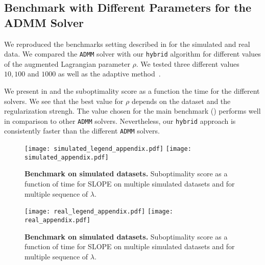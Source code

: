 \subsection{Benchmark with Different Parameters for the ADMM Solver}
\label{sec:admm-benchmarks}

We reproduced the benchmarks setting described in  for the simulated and real data.
We compared the \texttt{ADMM} solver with our \texttt{hybrid} algorithm for different values of the augmented Lagrangian parameter $\rho$.
We tested three different values $10, 100$ and $1000$ as well as the adaptive method~\parencite[Sec. 3.4.1]{boyd2010}.

We present in  and  the suboptimality score as a function the time for the different solvers.
We see that the best value for $\rho$ depends on the dataset and the regularization strengh.
The value chosen for the main benchmark () performs well in comparison to other \texttt{ADMM} solvers.
Nevertheless, our \texttt{hybrid} approach is consistently faster than the different  \texttt{ADMM} solvers.

\begin{figure*}[!t]
  \centering
  \texttt{[image: simulated\_legend\_appendix.pdf]}
  \texttt{[image: simulated\_appendix.pdf]}
  \caption{\textbf{Benchmark on simulated datasets.} Suboptimality score as a function of time for SLOPE on multiple simulated datasets and for multiple sequence of $\lambda$.}
  \label{fig:simulated_appendix}
\end{figure*}


\begin{figure*}[!t]
  \centering
  \texttt{[image: real\_legend\_appendix.pdf]}
  \texttt{[image: real\_appendix.pdf]}
  \caption{\textbf{Benchmark on simulated datasets.} Suboptimality score as a function of time for SLOPE on multiple simulated datasets and for multiple sequence of $\lambda$.}
  \label{fig:real_appendix}
\end{figure*}
